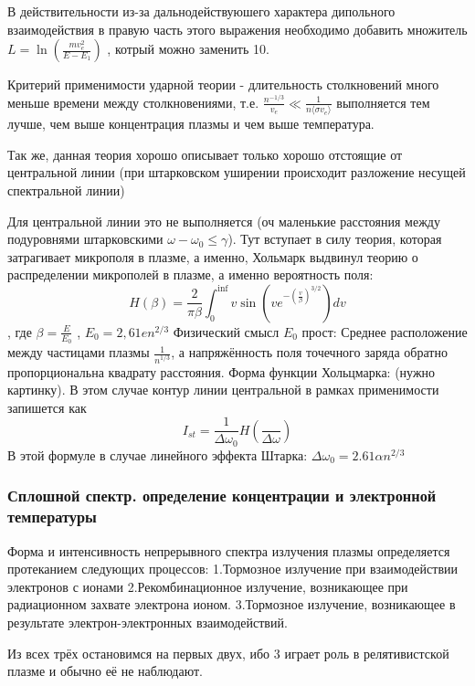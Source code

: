 \documentclass[10pt, a4paper]{article}
\begin{document}
В действительности из-за дальнодействуюшего характера дипольного взаимодействия в правую часть этого выражения необходимо добавить множитель $L= \ln(\frac{m v_e^{2}}{E-E_1})$ , котрый можно заменить 10.

Критерий применимости ударной теории - длительность столкновений много меньше времени между столкновениями, т.е. $\frac{n^{-1/3}}{v_e} \ll \frac{1}{n \langle\sigma v_e\rangle} $ выполняется тем лучше, чем выше концентрация плазмы и чем выше температура.

Так же, данная теория хорошо описывает только хорошо отстоящие от центральной линии (при штарковском уширении происходит разложение несущей спектральной линии)

Для центральной линии это не выполняется (оч маленькие расстояния между подуровнями штарковскими $\omega - \omega_0 \leq \gamma$).
Тут вступает в силу теория, которая затрагивает микрополя в плазме, а именно, Хольмарк выдвинул теорию о распределении микрополей в плазме, а именно вероятность поля:
\begin{equation}
	H( \beta ) = \frac{2}{\pi \beta} \int_{0}^{\inf} v \sin(v e^{- (\frac{v}{\beta})^{3/2}}) dv
\end{equation}
, где $\beta = \frac{E}{E_0}$ , $E_0 = 2,61 e n^{2/3}$ 
Физический смысл $E_0$ прост: Среднее расположение между частицами плазмы $\frac{1}{n^{1/3}} $, а напряжённость поля точечного заряда обратно пропорциональна квадрату расстояния. Форма функции Хольцмарка:
(нужно картинку).
В этом случае контур линии центральной в рамках применимости запишется как 
\begin{equation}
	I_{st}=\frac{1}{\Delta \omega_0} H(\frac{}{\Delta \omega})
\end{equation}
В этой формуле в случае линейного эффекта Штарка: $\Delta \omega_0 = 2.61 \alpha n^{2/3}$

\subsubsection{Сплошной спектр. определение концентрации и электронной температуры}

Форма и интенсивность непрерывного спектра излучения плазмы определяется протеканием следующих процессов:
1.Тормозное излучение при взаимодействии электронов с ионами
2.Рекомбинационное излучение, возникающее при радиационном захвате электрона ионом.
3.Тормозное излучение, возникающее в результате электрон-электронных взаимодействий.

Из всех трёх остановимся на первых двух, ибо 3 играет роль в релятивистской плазме и обычно её не наблюдают.
\end{document}
